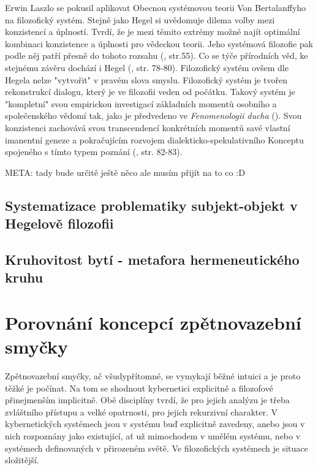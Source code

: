 \documentclass[11pt,a4paper]{article}
\begin{document}
Erwin Laszlo se pokusil aplikovat Obecnou systémovou teorii Von Bertalanffyho na filozofický systém. Stejně jako Hegel si uvědomuje dilema volby mezi konzistencí a úplností. Tvrdí, že je mezi těmito extrémy možné najít optimální kombinaci konzistence a úplnosti pro vědeckou teorii. Jeho systémová filozofie pak podle něj patří přesně do tohoto rozsahu (\cite{laszlo_systems_1983, kainz_paradox_1988}, str.55). Co se týče přírodních věd, ke stejnému závěru dochází i Hegel (\cite{kainz_paradox_1988}, str. 78-80). Filozofický systém ovšem dle Hegela nelze "vytvořit" v pravém slova smyslu. Filozofický systém je tvořen rekonstrukcí dialogu, který je ve filozofii veden od počátku. Takový systém je "kompletní" svou empirickou investigací základních momentů osobního a společenského vědomí tak, jako je předvedeno ve \textit{Fenomenologii ducha} (\cite{hegel_fenomenologie_2019}). Svou konzistenci zachovává svou transcendencí konkrétních momentů savé vlastní imanentní geneze a pokračujícím rozvojem dialekticko-spekulativního Konceptu spojeného s tímto typem poznání (\cite{kainz_paradox_1988}, str. 82-83).

META: tady bude určitě ještě něco ale musím přijít na to co :D

\subsection{Systematizace problematiky subjekt-objekt v Hegelově filozofii}




\subsection{Kruhovitost bytí - metafora hermeneutického kruhu}





\section{Porovnání koncepcí zpětnovazební smyčky}

Zpětnovazební smyčky, ač všudypřítomné, se vymykají běžné intuici a je proto těžké je počínat. Na tom se shodnout kybernetici explicitně a filozofové přinejmenším implicitně. Obě disciplíny tvrdí, že pro jejich analýzu je třeba zvláštního přístupu a velké opatrnosti, pro jejich rekurzivní charakter. V kybernetických systémech jsou v systému buď explicitně zavedeny, anebo jsou v nich rozpoznány jako existující, ať už mimochodem v umělém systému, nebo v systémech definovaných v přirozeném světě. Ve filozofických systémech je situace složitější.
\end{document}
